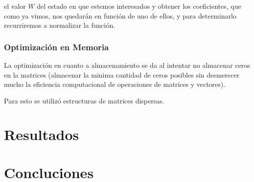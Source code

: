 \documentclass[a4paper,openright,12pt, oneside]{book}
\begin{document}
el valor $W$ del estado en que estemos interesados y obtener los coeficientes, que como ya vimos, nos quedar\'an en funci\'on de uno de ellos, y para determinarlo recurriremos a normalizar la funci\'on.




\subsection{Optimizaci\'on en Memoria}

La optimizaci\'on en cuanto a almacenamiento se da al intentar no almacenar ceros en la matrices (almacenar la minima cantidad de ceros posibles sin desmerecer mucho la eficiencia computacional de operaciones de matrices y vectores).

Para esto se utiliz\'o estructuras de matrices dispersas.


\setcounter{chapter}{5}
\setcounter{section}{0}
\chapter*{Resultados}\label{Resultados}
\markboth{}{} %


\setcounter{chapter}{6}
\setcounter{section}{0}
\chapter*{Concluciones}\label{Concluciones}
\markboth{}{} %
\end{document}
